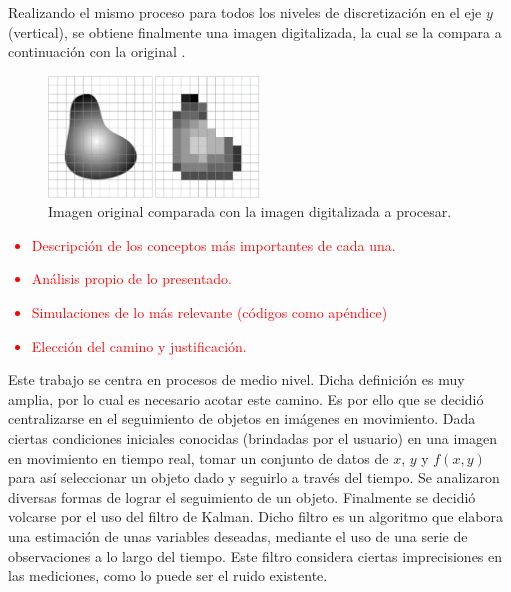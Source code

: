 Realizando el mismo proceso para todos los niveles de discretización en el eje $y$ (vertical), se obtiene finalmente una imagen digitalizada, la cual se la compara a continuación con la original \cite{ref:digit1}.
\begin{figure}[H]
\centering
	\includegraphics[width=0.5\textwidth]{Imagenes/Digitalizacion_3.png}
	\caption{Imagen original comparada con la imagen digitalizada a procesar.}
	\label{fig:disc3}
\end{figure}

\textcolor{red}{
\begin{itemize}
	\item Descripción de los conceptos más importantes de cada una.
	\item Análisis propio de lo presentado.
	\item Simulaciones de lo más relevante (códigos como apéndice)
	\item Elección del camino y justificación.
\end{itemize}
}

Este trabajo se centra en procesos de medio nivel. Dicha definición es muy amplia, por lo cual es necesario acotar este camino. Es por ello que se decidió centralizarse en el seguimiento de objetos en imágenes en movimiento. Dada ciertas condiciones iniciales conocidas (brindadas por el usuario) en una imagen en movimiento en tiempo real, tomar un conjunto de datos de $x$, $y$ y $f(x,y)$ para así seleccionar un objeto dado y seguirlo a través del tiempo. %
Se analizaron diversas formas de lograr el seguimiento de un objeto. Finalmente se decidió volcarse por el uso del filtro de Kalman. Dicho filtro es un algoritmo que elabora una estimación de unas variables deseadas, mediante el uso de una serie de observaciones a lo largo del tiempo. Este filtro considera ciertas imprecisiones en las mediciones, como lo puede ser el ruido existente. %
	
